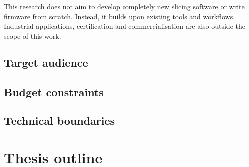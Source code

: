 This research does not aim to develop completely new slicing software or write firmware from scratch. Instead, it builds upon existing tools and workflows. Industrial applications, certification and commercialisation are also outside the scope of this work.

\subsection{Target audience}
\label{subsec:intro-target-audience}

\subsection{Budget constraints}
\label{subsec:intro-budget}

\subsection{Technical boundaries}
\label{subsec:intro-technical-boundaries}

\section{Thesis outline}
\label{sec:intro-outline}
